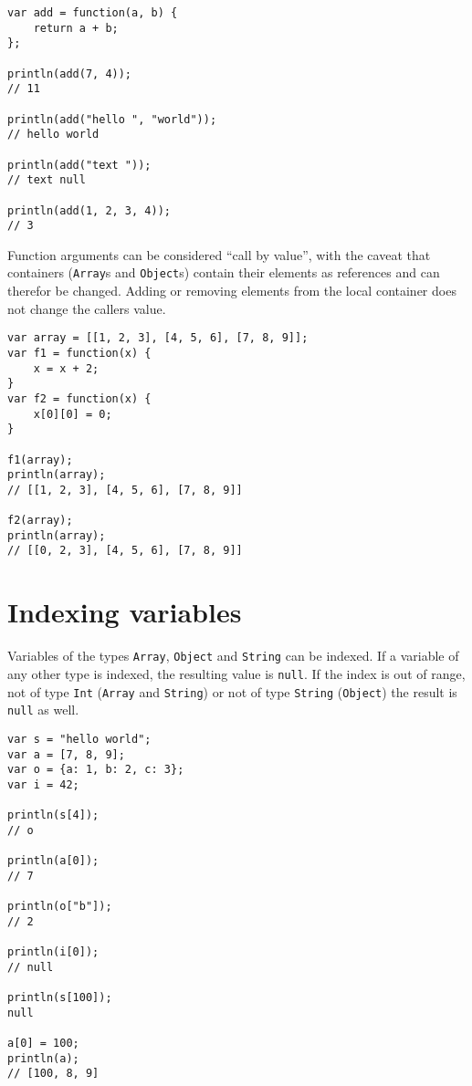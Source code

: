 \documentclass[a4paper, parskip, 10pt]{scrartcl}
\begin{document}
\begin{lstlisting}
var add = function(a, b) {
    return a + b;
};

println(add(7, 4));
// 11

println(add("hello ", "world"));
// hello world

println(add("text "));
// text null

println(add(1, 2, 3, 4));
// 3
\end{lstlisting}

Function arguments can be considered \enquote{call by value}, with the caveat
that containers (\texttt{Array}s and \texttt{Object}s) contain their elements
as references and can therefor be changed. Adding or removing elements from the
local container does not change the callers value.

\begin{lstlisting}
var array = [[1, 2, 3], [4, 5, 6], [7, 8, 9]];
var f1 = function(x) {
    x = x + 2;
}
var f2 = function(x) {
    x[0][0] = 0;
}

f1(array);
println(array);
// [[1, 2, 3], [4, 5, 6], [7, 8, 9]]

f2(array);
println(array);
// [[0, 2, 3], [4, 5, 6], [7, 8, 9]]
\end{lstlisting}

\section{Indexing variables}
Variables of the types \texttt{Array}, \texttt{Object} and \texttt{String} can
be indexed. If a variable of any other type is indexed, the resulting value is
\texttt{null}. If the index is out of range, not of type \texttt{Int}
(\texttt{Array} and \texttt{String}) or not of type \texttt{String}
(\texttt{Object}) the result is \texttt{null} as well.

\begin{lstlisting}
var s = "hello world";
var a = [7, 8, 9];
var o = {a: 1, b: 2, c: 3};
var i = 42;

println(s[4]);
// o

println(a[0]);
// 7

println(o["b"]);
// 2

println(i[0]);
// null

println(s[100]);
null

a[0] = 100;
println(a);
// [100, 8, 9]
\end{lstlisting}
\end{document}
